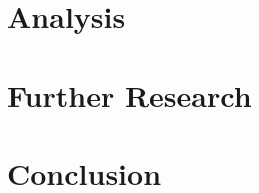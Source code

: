 \documentclass[12pt]{report}
\begin{document}
\section*{Analysis}
\section*{Further Research}
\section*{Conclusion}
\end{document}
